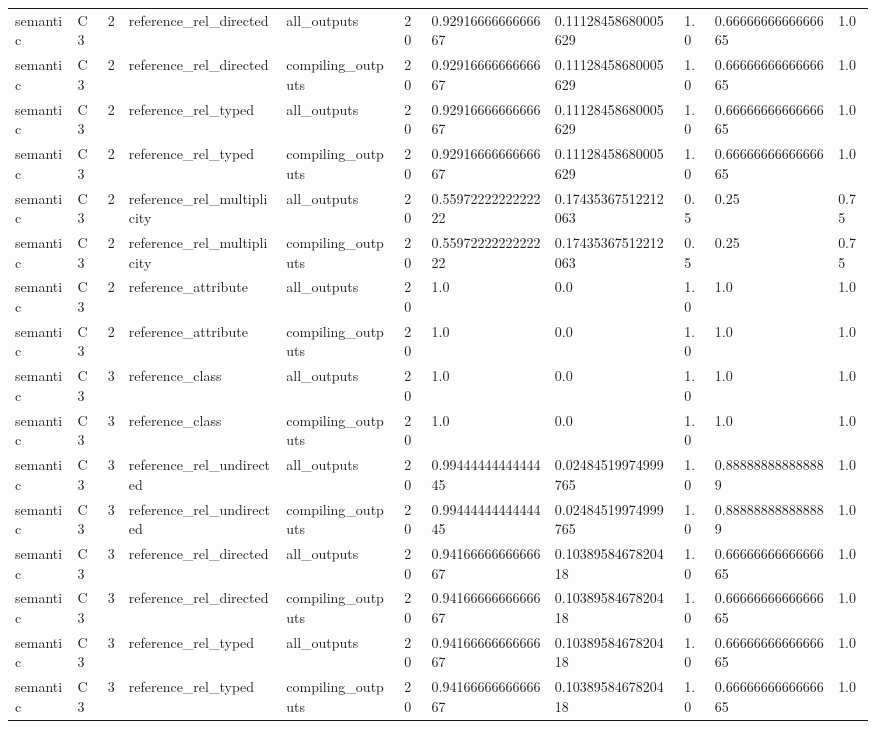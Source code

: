 \begin{tabular}{lllllllllll}
semantic & C3 & 2 & reference\_rel\_directed & all\_outputs & 20 & 0.9291666666666667 & 0.11128458680005629 & 1.0 & 0.6666666666666665 & 1.0 \\
semantic & C3 & 2 & reference\_rel\_directed & compiling\_outputs & 20 & 0.9291666666666667 & 0.11128458680005629 & 1.0 & 0.6666666666666665 & 1.0 \\
semantic & C3 & 2 & reference\_rel\_typed & all\_outputs & 20 & 0.9291666666666667 & 0.11128458680005629 & 1.0 & 0.6666666666666665 & 1.0 \\
semantic & C3 & 2 & reference\_rel\_typed & compiling\_outputs & 20 & 0.9291666666666667 & 0.11128458680005629 & 1.0 & 0.6666666666666665 & 1.0 \\
semantic & C3 & 2 & reference\_rel\_multiplicity & all\_outputs & 20 & 0.5597222222222222 & 0.17435367512212063 & 0.5 & 0.25 & 0.75 \\
semantic & C3 & 2 & reference\_rel\_multiplicity & compiling\_outputs & 20 & 0.5597222222222222 & 0.17435367512212063 & 0.5 & 0.25 & 0.75 \\
semantic & C3 & 2 & reference\_attribute & all\_outputs & 20 & 1.0 & 0.0 & 1.0 & 1.0 & 1.0 \\
semantic & C3 & 2 & reference\_attribute & compiling\_outputs & 20 & 1.0 & 0.0 & 1.0 & 1.0 & 1.0 \\
semantic & C3 & 3 & reference\_class & all\_outputs & 20 & 1.0 & 0.0 & 1.0 & 1.0 & 1.0 \\
semantic & C3 & 3 & reference\_class & compiling\_outputs & 20 & 1.0 & 0.0 & 1.0 & 1.0 & 1.0 \\
semantic & C3 & 3 & reference\_rel\_undirected & all\_outputs & 20 & 0.9944444444444445 & 0.02484519974999765 & 1.0 & 0.888888888888889 & 1.0 \\
semantic & C3 & 3 & reference\_rel\_undirected & compiling\_outputs & 20 & 0.9944444444444445 & 0.02484519974999765 & 1.0 & 0.888888888888889 & 1.0 \\
semantic & C3 & 3 & reference\_rel\_directed & all\_outputs & 20 & 0.9416666666666667 & 0.1038958467820418 & 1.0 & 0.6666666666666665 & 1.0 \\
semantic & C3 & 3 & reference\_rel\_directed & compiling\_outputs & 20 & 0.9416666666666667 & 0.1038958467820418 & 1.0 & 0.6666666666666665 & 1.0 \\
semantic & C3 & 3 & reference\_rel\_typed & all\_outputs & 20 & 0.9416666666666667 & 0.1038958467820418 & 1.0 & 0.6666666666666665 & 1.0 \\
semantic & C3 & 3 & reference\_rel\_typed & compiling\_outputs & 20 & 0.9416666666666667 & 0.1038958467820418 & 1.0 & 0.6666666666666665 & 1.0 \\

\end{tabular}
